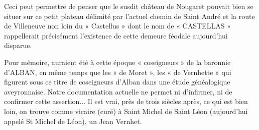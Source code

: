 \bigskip

Ceci peut permettre de penser que le susdit château de Nougaret pouvait bien se situer sur ce petit plateau délimité par l'actuel chemin de Saint André et la route de Villeneuve non loin du « Castellus » dont le nom de « CASTELLAS » rappellerait précisément l'existence de cette demeure féodale aujourd'hui disparue.

Pour mémoire, auraient été à cette époque « coseigneurs » de la baronnie d'ALBAN, en même temps que les « de Moret », les « de Vernhette » qui figurent sous ce titre de coseigneurs d'Alban dans une étude généalogique aveyronnaise. Notre documentation actuelle ne permet ni d'infirmer, ni de confirmer cette assertion... Il est vrai, près de trois siècles après, ce qui est bien loin, on trouve comme vicaire (curé) à Saint Michel de Saint Léon (aujourd'hui appelé St Michel de Léon), un Jean Vernhet.
